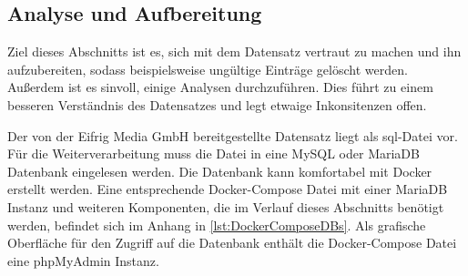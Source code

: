 \subsection{Analyse und Aufbereitung}
\label{sec:AnalyseAufbereitung}

Ziel dieses Abschnitts ist es, sich mit dem Datensatz vertraut zu machen und ihn aufzubereiten, sodass beispielsweise ungültige Einträge gelöscht werden.
Außerdem ist es sinvoll, einige Analysen durchzuführen.
Dies führt zu einem besseren Verständnis des Datensatzes und legt etwaige Inkonsitenzen offen.

Der von der Eifrig Media GmbH bereitgestellte Datensatz liegt als sql-Datei vor.
Für die Weiterverarbeitung muss die Datei in eine MySQL oder MariaDB Datenbank eingelesen werden.
Die Datenbank kann komfortabel mit Docker erstellt werden.
Eine entsprechende Docker-Compose Datei mit einer MariaDB Instanz und weiteren Komponenten, die im Verlauf dieses Abschnitts benötigt werden, befindet sich im Anhang in \autoref{lst:DockerComposeDBs}.
Als grafische Oberfläche für den Zugriff auf die Datenbank enthält die Docker-Compose Datei eine phpMyAdmin Instanz.
